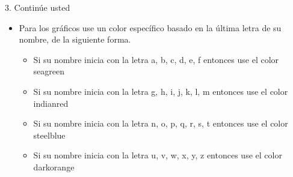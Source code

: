 \documentclass[
  ignorenonframetext,
]{beamer}
\providecommand{\tightlist}{%
  \setlength{\itemsep}{0pt}\setlength{\parskip}{0pt}}
\begin{document}
\begin{frame}{3. Continúe usted}
\label{continuxfae-usted}
\begin{tcolorbox}[enhanced jigsaw, opacitybacktitle=0.6, toprule=.15mm, opacityback=0, colbacktitle=quarto-callout-caution-color!10!white, colback=white, leftrule=.75mm, bottomrule=.15mm, colframe=quarto-callout-caution-color-frame, titlerule=0mm, coltitle=black, bottomtitle=1mm, breakable, rightrule=.15mm, toptitle=1mm, title=\textcolor{quarto-callout-caution-color}{\faFire}\hspace{0.5em}{Caution}, arc=.35mm, left=2mm]

\begin{itemize}
\item
  Para los gráficos use un color específico basado en la última letra de
  su nombre, de la siguiente forma.

  \begin{itemize}
  \tightlist
  \item
    Si su nombre inicia con la letra a, b, c, d, e, f entonces use el
    color {seagreen}
  \item
    Si su nombre inicia con la letra g, h, i, j, k, l, m entonces use el
    color {indianred}\\
  \item
    Si su nombre inicia con la letra n, o, p, q, r, s, t entonces use el
    color {steelblue}
  \item
    Si su nombre inicia con la letra u, v, w, x, y, z entonces use el
    color {darkorange}
  \end{itemize}
\end{itemize}

\end{tcolorbox}
\end{frame}
\end{document}
